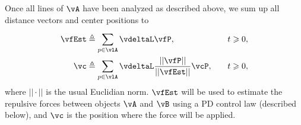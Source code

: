 Once all lines of $\vA$ have been analyzed as described above, we sum up all distance vectors and center positions to
\begin{align}
	\vfEst &\triangleq \sum_{p \in \vlA}^{} \vdeltaL \vfP, \quad                             &t \geqslant 0,\\
	\vc    &\triangleq \sum_{p \in \vlA}^{} \vdeltaL \frac{||\vfP||}{||\vfEst||} \vcP, \quad &t \geqslant 0,
\end{align}
where $||\cdot||$ is the usual Euclidian norm.
$\vfEst$ will be used to estimate the repulsive forces between objects $\vA$ and $\vB$ using a PD control law (described below), and $\vc$ is the position where the force will be applied.